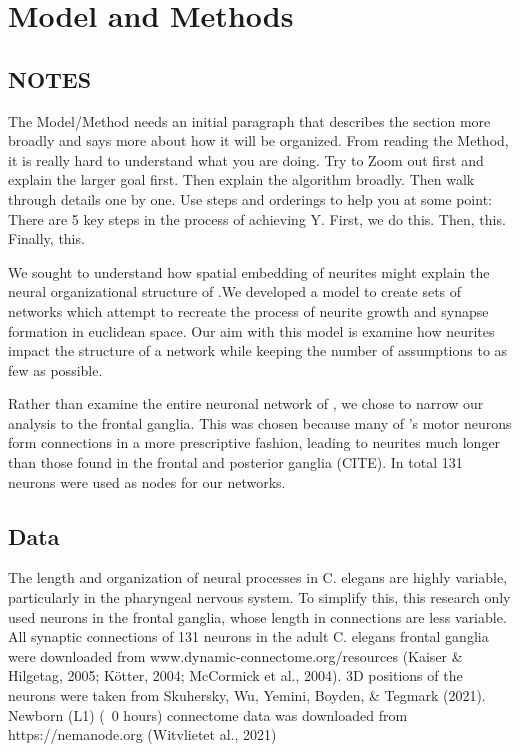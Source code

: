 \section{Model and Methods}
\subsection{NOTES}

The Model/Method needs an initial paragraph that describes the section more broadly and says more about how it will be organized. From reading the Method, it is really hard to understand what you are doing. Try to Zoom out first and explain the larger goal first. Then explain the algorithm broadly. Then walk through details one by one. Use steps and orderings to help you at some point: There are 5 key steps in the process of achieving Y. First, we do this. Then, this. Finally, this.

We sought to understand how spatial embedding of neurites might explain the neural organizational structure of \ce.We developed a model to create sets of networks which attempt to recreate the process of neurite growth and synapse formation in euclidean space. Our aim with this model is examine how neurites impact the structure of a network while keeping the number of assumptions to as few as possible.

Rather than examine the entire neuronal network of \ce, we chose to narrow our analysis to the frontal ganglia. This was chosen because many of \ce's motor neurons form connections in a more prescriptive fashion, leading to neurites much longer than those found in the frontal and posterior ganglia (CITE). In total 131 neurons were used as nodes for our networks.




\subsection{Data}
The length and organization of neural processes in C. elegans are highly variable, particularly in the pharyngeal nervous system. To simplify this, this research only used neurons in the frontal ganglia, whose length in connections are less variable. All synaptic connections of 131 neurons in the adult C. elegans frontal ganglia were downloaded from www.dynamic-connectome.org/resources (Kaiser \& Hilgetag, 2005; Kötter, 2004; McCormick et al., 2004). 3D positions of the neurons were taken from Skuhersky, Wu, Yemini, Boyden, \& Tegmark (2021). Newborn (L1) (~0 hours) connectome data was downloaded from https://nemanode.org (Witvlietet al., 2021)
